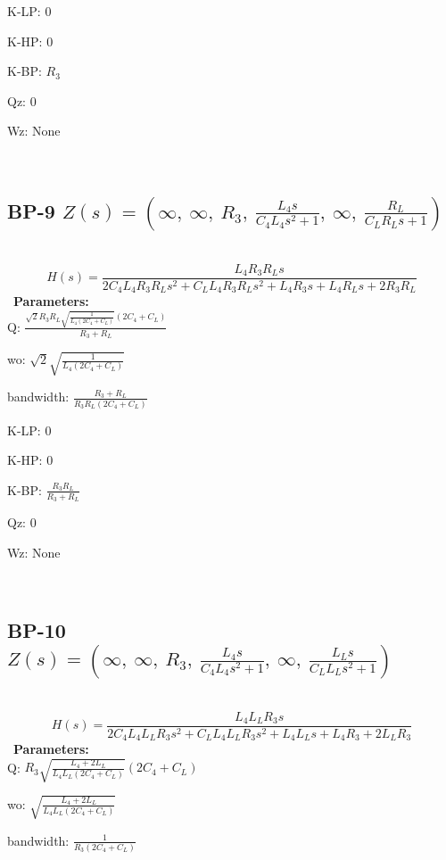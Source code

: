 \documentclass{article}
\begin{document}
K-LP: $0$\ 

K-HP: $0$\ 

K-BP: $R_{3}$\ 

Qz: $0$\ 

Wz: $\text{None}$\ 

\ 

\subsection{BP-9 $Z(s) = \left( \infty, \  \infty, \  R_{3}, \  \frac{L_{4} s}{C_{4} L_{4} s^{2} + 1}, \  \infty, \  \frac{R_{L}}{C_{L} R_{L} s + 1}\right)$ } \ 
\textbf{\[H(s) = \frac{L_{4} R_{3} R_{L} s}{2 C_{4} L_{4} R_{3} R_{L} s^{2} + C_{L} L_{4} R_{3} R_{L} s^{2} + L_{4} R_{3} s + L_{4} R_{L} s + 2 R_{3} R_{L}}\] } \ 
\textbf{Parameters:}\\ 

Q: $\frac{\sqrt{2} R_{3} R_{L} \sqrt{\frac{1}{L_{4} \left(2 C_{4} + C_{L}\right)}} \left(2 C_{4} + C_{L}\right)}{R_{3} + R_{L}}$\ 

wo: $\sqrt{2} \sqrt{\frac{1}{L_{4} \left(2 C_{4} + C_{L}\right)}}$\ 

bandwidth: $\frac{R_{3} + R_{L}}{R_{3} R_{L} \left(2 C_{4} + C_{L}\right)}$\ 

K-LP: $0$\ 

K-HP: $0$\ 

K-BP: $\frac{R_{3} R_{L}}{R_{3} + R_{L}}$\ 

Qz: $0$\ 

Wz: $\text{None}$\ 

\ 

\subsection{BP-10 $Z(s) = \left( \infty, \  \infty, \  R_{3}, \  \frac{L_{4} s}{C_{4} L_{4} s^{2} + 1}, \  \infty, \  \frac{L_{L} s}{C_{L} L_{L} s^{2} + 1}\right)$ } \ 
\textbf{\[H(s) = \frac{L_{4} L_{L} R_{3} s}{2 C_{4} L_{4} L_{L} R_{3} s^{2} + C_{L} L_{4} L_{L} R_{3} s^{2} + L_{4} L_{L} s + L_{4} R_{3} + 2 L_{L} R_{3}}\] } \ 
\textbf{Parameters:}\\ 

Q: $R_{3} \sqrt{\frac{L_{4} + 2 L_{L}}{L_{4} L_{L} \left(2 C_{4} + C_{L}\right)}} \left(2 C_{4} + C_{L}\right)$\ 

wo: $\sqrt{\frac{L_{4} + 2 L_{L}}{L_{4} L_{L} \left(2 C_{4} + C_{L}\right)}}$\ 

bandwidth: $\frac{1}{R_{3} \left(2 C_{4} + C_{L}\right)}$\ 
\end{document}

